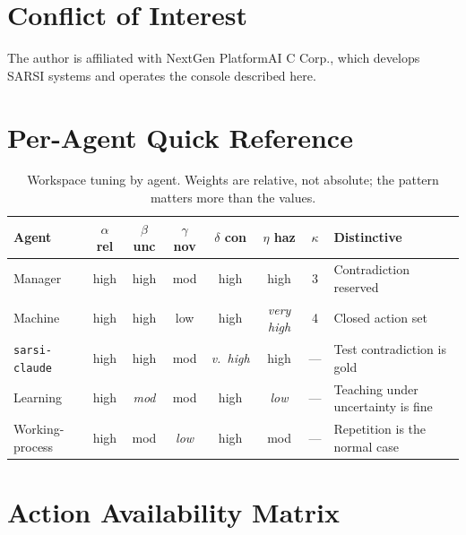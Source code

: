 \documentclass[11pt]{article}
\newcommand{\code}[1]{\texttt{\small #1}}
\begin{document}
\section*{Conflict of Interest}
The author is affiliated with NextGen PlatformAI C Corp., which develops SARSI systems and operates the console described here.

\appendix

\section{Per-Agent Quick Reference}
\label{app:quickref}

\begin{table}[h]
\centering\footnotesize
\caption{Workspace tuning by agent. Weights are relative, not absolute; the pattern matters more than the values.}
\label{tab:tuning}
\begin{tabular}{@{}L{1.9cm}ccccccL{2.5cm}@{}}
\toprule
\textbf{Agent} & $\alpha$ rel & $\beta$ unc & $\gamma$ nov & $\delta$ con & $\eta$ haz & $\kappa$ & \textbf{Distinctive} \\
\midrule
Manager & high & high & mod & high & high & 3 & Contradiction reserved \\
Machine & high & high & low & high & \emph{very high} & 4 & Closed action set \\
\code{sarsi-}\code{claude} & high & high & mod & \emph{v.\ high} & high & --- & Test contradiction is gold \\
Learning & high & \emph{mod} & mod & high & \emph{low} & --- & Teaching under uncertainty is fine \\
Working-process & high & mod & \emph{low} & high & mod & --- & Repetition is the normal case \\
\bottomrule
\end{tabular}
\end{table}

\section{Action Availability Matrix}
\label{app:actions}
\end{document}
